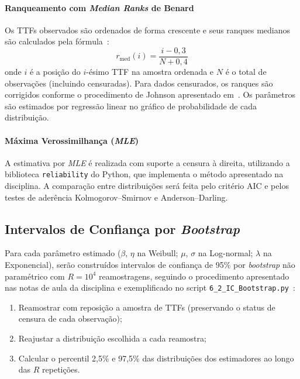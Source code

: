 \documentclass[conference]{IEEEtran}
\begin{document}
\paragraph{Ranqueamento com \textit{Median Ranks} de Benard}
Os TTFs observados são ordenados de forma crescente e seus ranques
medianos são calculados pela fórmula~\cite{oconnor2012,bessani2026}:
\begin{equation}
    r_{\text{med}}(i) = \frac{i - 0{,}3}{N + 0{,}4}
\end{equation}
onde $i$ é a posição do $i$-ésimo TTF na amostra ordenada e $N$ é o
total de observações (incluindo censuradas). Para dados censurados, os
ranques são corrigidos conforme o procedimento de Johnson apresentado
em~\cite{oconnor2012}. Os parâmetros são estimados por regressão linear
no gráfico de probabilidade de cada distribuição.

\paragraph{Máxima Verossimilhança (\textit{MLE})}
A estimativa por \textit{MLE} é realizada com suporte a censura à direita,
utilizando a biblioteca \texttt{reliability} do Python, que implementa
o método apresentado na disciplina. A comparação entre distribuições
será feita pelo critério AIC e pelos testes de aderência
Kolmogorov--Smirnov e Anderson--Darling.

\subsection{Intervalos de Confiança por \textit{Bootstrap}}

Para cada parâmetro estimado ($\beta$, $\eta$ na Weibull; $\mu$,
$\sigma$ na Log-normal; $\lambda$ na Exponencial), serão construídos
intervalos de confiança de 95\% por \textit{bootstrap} não paramétrico
com $R = 10^{4}$ reamostragens, seguindo o procedimento apresentado
nas notas de aula da disciplina e exemplificado no script
\texttt{6\_2\_IC\_Bootstrap.py}~\cite{bessani2026}:

\begin{enumerate}
    \item Reamostrar com reposição a amostra de TTFs (preservando
    o status de censura de cada observação);
    \item Reajustar a distribuição escolhida a cada reamostra;
    \item Calcular o percentil 2,5\% e 97,5\% das distribuições dos
    estimadores ao longo das $R$ repetições.
\end{enumerate}
\end{document}
